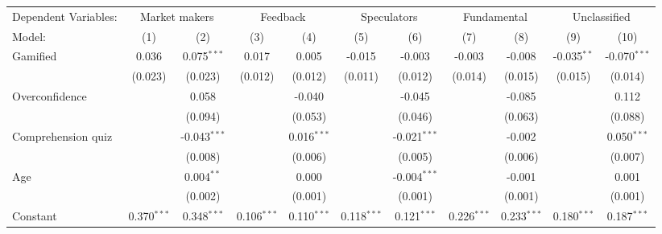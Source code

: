 \begin{tabular}{lcccccccccc}
   \tabularnewline \midrule \midrule
   Dependent Variables: & \multicolumn{2}{c}{Market makers} & \multicolumn{2}{c}{Feedback} & \multicolumn{2}{c}{Speculators} & \multicolumn{2}{c}{Fundamental} & \multicolumn{2}{c}{Unclassified}\\
   Model:              & (1)           & (2)            & (3)           & (4)           & (5)           & (6)            & (7)           & (8)           & (9)           & (10)\\  
   \midrule
   Gamified            & 0.036         & 0.075$^{***}$  & 0.017         & 0.005         & -0.015        & -0.003         & -0.003        & -0.008        & -0.035$^{**}$ & -0.070$^{***}$\\   
                       & (0.023)       & (0.023)        & (0.012)       & (0.012)       & (0.011)       & (0.012)        & (0.014)       & (0.015)       & (0.015)       & (0.014)\\   
   Overconfidence      &               & 0.058          &               & -0.040        &               & -0.045         &               & -0.085        &               & 0.112\\   
                       &               & (0.094)        &               & (0.053)       &               & (0.046)        &               & (0.063)       &               & (0.088)\\   
   Comprehension quiz  &               & -0.043$^{***}$ &               & 0.016$^{***}$ &               & -0.021$^{***}$ &               & -0.002        &               & 0.050$^{***}$\\   
                       &               & (0.008)        &               & (0.006)       &               & (0.005)        &               & (0.006)       &               & (0.007)\\   
   Age                 &               & 0.004$^{**}$   &               & 0.000         &               & -0.004$^{***}$ &               & -0.001        &               & 0.001\\   
                       &               & (0.002)        &               & (0.001)       &               & (0.001)        &               & (0.001)       &               & (0.001)\\   
   Constant            & 0.370$^{***}$ & 0.348$^{***}$  & 0.106$^{***}$ & 0.110$^{***}$ & 0.118$^{***}$ & 0.121$^{***}$  & 0.226$^{***}$ & 0.233$^{***}$ & 0.180$^{***}$ & 0.187$^{***}$\\   

\end{tabular}
